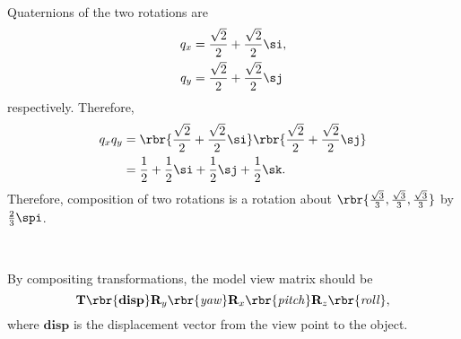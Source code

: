 \documentclass[english, nochinese]{../textmpls/pkupaper}
\begin{document}
\begin{thmquestion}
\
\begin{thmanswer}
Quaternions of the two rotations are
\begin{align}
q_x &= \frac{\sqrt{2}}{2} + \frac{\sqrt{2}}{2} \si, \\
q_y &= \frac{\sqrt{2}}{2} + \frac{\sqrt{2}}{2} \sj
\end{align}
respectively. Therefore,
\begin{equation}
\begin{split}
q_x q_y &= \rbr{ \frac{\sqrt{2}}{2} + \frac{\sqrt{2}}{2} \si } \rbr{ \frac{\sqrt{2}}{2} + \frac{\sqrt{2}}{2} \sj } \\
&= \frac{1}{2} + \frac{1}{2} \si + \frac{1}{2} \sj + \frac{1}{2} \sk.
\end{split}
\end{equation}
Therefore, composition of two rotations is a rotation about $ \rbr{ \frac{\sqrt{3}}{3}, \frac{\sqrt{3}}{3}, \frac{\sqrt{3}}{3} } $ by $ \frac{2}{3} \spi $.
\end{thmanswer}
\end{thmquestion}

\begin{thmquestion}
\
\begin{thmanswer}
By compositing transformations, the model view matrix should be
\begin{equation}
\mathbf{T} \rbr{\mathbf{disp}} \mathbf{R}_y \rbr{\mathit{yaw}} \mathbf{R}_x \rbr{\mathit{pitch}} \mathbf{R}_z \rbr{\mathit{roll}},
\end{equation}
where $\mathbf{disp}$ is the displacement vector from the view point to the object.
\end{thmanswer}
\end{thmquestion}
\end{document}
